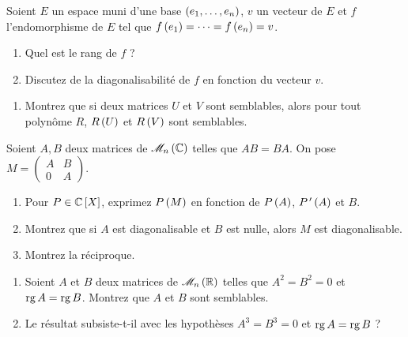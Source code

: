 \begin{exo}
Soient \(E\) un espace muni d'une base \(\left(e_1,\dots,e_n\right)\), \(v\) un vecteur de \(E\) et \(f\) l'endomorphisme de \(E\) tel que \(f\left(e_1\right)=\dots=f\left(e_n\right)=v\).

\begin{enumerate}
    \item Quel est le rang de \(f\) ? \\
    \item Discutez de la diagonalisabilité de \(f\) en fonction du vecteur \(v\).
\end{enumerate}
\end{exo}



\begin{exo}
\begin{enumerate}[series=oral5.15]
    \item Montrez que si deux matrices \(U\) et \(V\) sont semblables, alors pour tout polynôme \(R\), \(R\left(U\right)\) et \(R\left(V\right)\) sont semblables.
\end{enumerate}

Soient \(A,B\) deux matrices de \(\M{n}[\C]\) telles que \(AB=BA\). On pose \(M=\begin{pmatrix}
A & B \\
0 & A
\end{pmatrix}\).

\begin{enumerate}[resume=oral5.15]
    \item Pour \(P\in\poly[\C]\), exprimez \(P\left(M\right)\) en fonction de \(P\left(A\right)\), \(P^{\,\prime}\left(A\right)\) et \(B\). \\
    \item Montrez que si \(A\) est diagonalisable et \(B\) est nulle, alors \(M\) est diagonalisable. \\
    \item Montrez la réciproque.
\end{enumerate}
\end{exo}



\begin{exo}
\begin{enumerate}
    \item Soient \(A\) et \(B\) deux matrices de \(\M{n}[\R]\) telles que \(A^2=B^2=0\) et \(\operatorname{rg} A=\operatorname{rg} B\). Montrez que \(A\) et \(B\) sont semblables. \\
    \item Le résultat subsiste-t-il avec les hypothèses \(A^3=B^3=0\) et \(\operatorname{rg} A=\operatorname{rg} B\) ?
\end{enumerate}
\end{exo}



